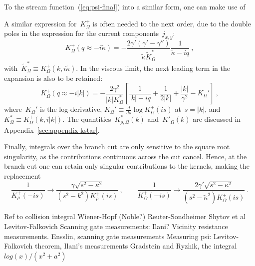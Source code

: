 \documentclass[preprint,aps,eqsecnum, prb]{revtex4-1}
\newcommand{\fplus}[1]{{#1}^{+}}
\begin{document}
To the stream function~(\ref{eq:psi-final}) into a similar form,
one can make use of

 A similar expression
for~$\fplus{K}_\Omega$ is often needed to the next order, due to the double poles in the expression for the current components~$j_{x, y}$:
\begin{equation}
\fplus{K}_\Omega(q \approx -i {\tilde \kappa})
= - \frac{2 \gamma' (\gamma' - \gamma'') }{{\tilde \kappa}
    {\tilde K}_\Omega^\ast}
     \frac{1}{{\tilde \kappa} - i q}
\ ,
\end{equation}
with~${\tilde K}_\Omega^\ast \equiv \fplus{K}_\Omega(k, i{\tilde \kappa})$.
In the viscous limit, the next leading term in the expansion
is also to be retained:
\begin{equation}
\fplus{K}_\Omega(q \approx -i |k|)
= - \frac{2 \gamma^2 }{|k| K_\Omega^\ast}
     \left[
     \frac{1}{|k| - i q}
      + \frac{1}{2|k|} + \frac{|k|}{\gamma^2} - K_\Omega'\right]
\ ,
\end{equation}
where~$K_\Omega'$ is the log-derivative,
$K_\Omega' \equiv \frac{d}{ds} \log \fplus{K}_\Omega(is)$ at~$s = |k|$,
and~$K_\Omega^\ast \equiv \fplus{K}_\Omega(k, i|k|)$.
The quantities~$K_{\rho,\Omega}^\ast(k)$ and~$K'_\Omega(k)$ are discussed
in Appendix~\ref{sec:appendix-kstar}.

Finally, integrals over the branch cut are only sensitive
to the square root singularity, as the contributions continuous
across the cut cancel.
Hence, at the branch cut one can retain only singular contributions
to the kernels, making the replacement
\begin{equation}
 \frac{1}{\fplus{K}_\rho (-is)} \to
  \frac{\gamma\sqrt{s^2 - \kappa^2}}{(s^2 - k^2) \fplus{K}_\rho(is)}
 \ , \qquad
 \frac{1}{\fplus{K}_\Omega(-is)} \to
 \frac{2 \gamma' \sqrt{s^2 - \kappa^2}}{(s^2 - {\tilde \kappa}^2)
 \fplus{K}_\Omega(is)}
 \ .
\end{equation}


\begin{thebibliography}{99}
 Ref to collision integral
 Wiener-Hopf (Noble?)
 Reuter-Sondheimer
 Shytov et al
 Levitov-Falkovich
 Scanning gate measurements: Ilani?
 Vicinity resistance measurements.
 Ensslin, scanning gate measurements
 Measuring psi: Levitov-Falkovich theorem,
  Ilani's measurements
 Gradstein and Ryzhik, the integral $log(x)/(x^2 + a^2)$
\end{thebibliography}
\end{document}
